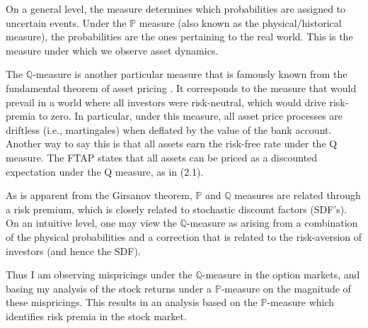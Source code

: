 On a general level, the measure determines which probabilities are assigned to uncertain events. Under the $\mathbb{P}$ measure (also known as the physical/historical measure), the probabilities are the ones pertaining to the real world. This is the measure under which we observe asset dynamics.

The $\mathbb{Q}$-measure is another particular measure that is famously known from the fundamental theorem of asset pricing \citep{delbaen1994general}. It corresponds to the measure that would prevail in a world where all investors were risk-neutral, which would drive risk-premia to zero. In particular, under this measure, all asset price processes are driftless (i.e., martingales) when deflated by the value of the bank account. Another way to say this is that all assets earn the risk-free rate under the Q measure. The FTAP states that all assets can be priced as a discounted expectation under the Q measure, as in (2.1).


As is apparent from the Girsanov theorem, $\mathbb{P}$ and $\mathbb{Q}$ measures are related through a risk premium, which is closely related to stochastic discount factors (SDF’s). On an intuitive level, one may view the $\mathbb{Q}$-measure as arising from a combination of the physical probabilities and a correction that is related to the risk-aversion of investors (and hence the SDF).

Thus I am observing mispricings under the $\mathbb{Q}$-measure in the option markets, and basing my analysis of the stock returns under a $\mathbb{P}$-measure on the magnitude of these mispricings. This results in an analysis based on the $\mathbb{P}$-measure which identifies risk premia in the stock market. 



